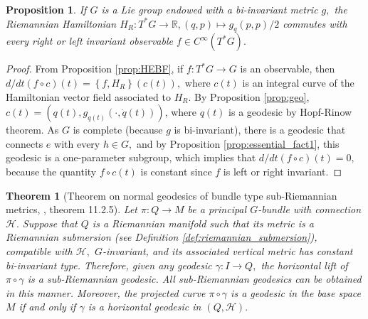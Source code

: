 \documentclass[12pt, letterpaper, reqno]{amsart}
\theoremstyle{definition}
\theoremstyle{plain}
\newtheorem{prop}{Proposition}
\newtheorem{thm}{Theorem}
\theoremstyle{remark}
\begin{document}
\begin{prop}\label{prop:essential_fact2}
	If $ G $ is a Lie group endowed with a bi-invariant metric $ g, $ the Riemannian Hamiltonian $ H_R : T^*G \rightarrow \mathbb{R}, (q,p) \mapsto g_q(p,p)/2$ commutes with every right or left invariant observable $ f\in C^\infty ( T^*G). $ 
\end{prop}
\begin{proof}
	From Proposition \ref{prop:HEBF}, if $ f: T^*G \rightarrow G $ is an observable, then $ d/dt \left( f\circ c \right) (t)= \left\{ f, H_R \right\}(c(t)),  $ where $ c(t) $ is an integral curve of the Hamiltonian vector field associated to $ H_R. $ By Proposition \ref{prop:geo}, $ c(t)=(q(t), g_{q(t)}(\cdot, \dot{q}(t))) $, where $ q(t) $ is a geodesic by Hopf-Rinow theorem. As $ G $ is complete (because $ g $ is bi-invariant), there is a geodesic that connects $ e $ with every $ h\in G, $ and by Proposition \ref{prop:essential_fact1}, this geodesic is a one-parameter subgroup, which implies that $ d/dt(f\circ c)(t)=0, $ because the quantity $ f\circ c(t) $ is constant since $ f $ is left or right invariant.	
\end{proof}

\begin{thm}[Theorem on normal geodesics of bundle type sub-Riemannian metrics, \cite{montgomery2002tour}, theorem 11.2.5]\label{thm:normal_geodesics}
	Let $ \pi: Q \rightarrow M $ be a principal $ G $-bundle with connection $ \mathcal{H}. $ Suppose that $ Q $ is a Riemannian manifold such that its metric is a Riemannian submersion (see Definition \ref{def:riemannian_submersion}), compatible with $ \mathcal{H}, $ $ G $-invariant, and its associated vertical metric has constant bi-invariant type. Therefore, given any geodesic $\gamma: I \rightarrow Q, $ the horizontal lift of $ \pi\circ\gamma $ is a sub-Riemannian geodesic. All sub-Riemannian geodesics can be obtained in this manner. Moreover, the projected curve $ \pi\circ\gamma$ is a geodesic in the base space $ M $ if and only if $ \gamma $ is a horizontal geodesic in $ (Q, \mathcal{H}). $ 
\end{thm}
\end{document}
